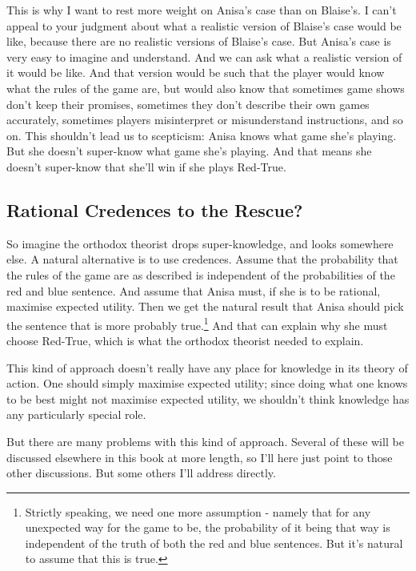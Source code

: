\documentclass[11pt,]{book}
\let\rmarkdownfootnote\footnote%
\def\footnote{\protect\rmarkdownfootnote}
\begin{document}
This is why I want to rest more weight on Anisa's case than on Blaise's. I can't appeal to your judgment about what a realistic version of Blaise's case would be like, because there are no realistic versions of Blaise's case. But Anisa's case is very easy to imagine and understand. And we can ask what a realistic version of it would be like. And that version would be such that the player would know what the rules of the game are, but would also know that sometimes game shows don't keep their promises, sometimes they don't describe their own games accurately, sometimes players misinterpret or misunderstand instructions, and so on. This shouldn't lead us to scepticism: Anisa knows what game she's playing. But she doesn't super-know what game she's playing. And that means she doesn't super-know that she'll win if she plays Red-True.

\hypertarget{probrescue}{%
\subsection{Rational Credences to the Rescue?}\label{probrescue}}

So imagine the orthodox theorist drops super-knowledge, and looks somewhere else. A natural alternative is to use credences. Assume that the probability that the rules of the game are as described is independent of the probabilities of the red and blue sentence. And assume that Anisa must, if she is to be rational, maximise expected utility. Then we get the natural result that Anisa should pick the sentence that is more probably true.\footnote{Strictly speaking, we need one more assumption - namely that for any unexpected way for the game to be, the probability of it being that way is independent of the truth of both the red and blue sentences. But it's natural to assume that this is true.} And that can explain why she must choose Red-True, which is what the orthodox theorist needed to explain.

This kind of approach doesn't really have any place for knowledge in its theory of action. One should simply maximise expected utility; since doing what one knows to be best might not maximise expected utility, we shouldn't think knowledge has any particularly special role.

But there are many problems with this kind of approach. Several of these will be discussed elsewhere in this book at more length, so I'll here just point to those other discussions. But some others I'll address directly.
\end{document}
